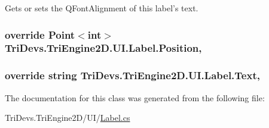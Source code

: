 Gets or sets the Q\-Font\-Alignment of this label's text. 

\hypertarget{class_tri_devs_1_1_tri_engine2_d_1_1_u_i_1_1_label_adc1aa6af6f6ba7e66611ae9be5a1033b}{
\subsubsection[{Position}]{\setlength{\rightskip}{0pt plus 5cm}override Point$<$int$>$ Tri\-Devs.\-Tri\-Engine2\-D.\-U\-I.\-Label.\-Position\hspace{0.3cm}{\ttfamily [get]}, {\ttfamily [set]}}}\label{class_tri_devs_1_1_tri_engine2_d_1_1_u_i_1_1_label_adc1aa6af6f6ba7e66611ae9be5a1033b}
\hypertarget{class_tri_devs_1_1_tri_engine2_d_1_1_u_i_1_1_label_a06d91dd4e855e27c97b5b652653e4971}{
\subsubsection[{Text}]{\setlength{\rightskip}{0pt plus 5cm}override string Tri\-Devs.\-Tri\-Engine2\-D.\-U\-I.\-Label.\-Text\hspace{0.3cm}{\ttfamily [get]}, {\ttfamily [set]}}}\label{class_tri_devs_1_1_tri_engine2_d_1_1_u_i_1_1_label_a06d91dd4e855e27c97b5b652653e4971}


The documentation for this class was generated from the following file\-:\begin{DoxyCompactItemize}
\item 
Tri\-Devs.\-Tri\-Engine2\-D/\-U\-I/\hyperlink{_label_8cs}{Label.\-cs}\end{DoxyCompactItemize}
